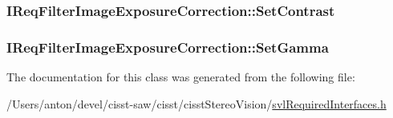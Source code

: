 \subsubsection[{Set\+Contrast}]{ I\+Req\+Filter\+Image\+Exposure\+Correction\+::\+Set\+Contrast}\label{class_i_req_filter_image_exposure_correction_a72a66c9ea243b3702d5f9bd6127a44f8}
\hypertarget{class_i_req_filter_image_exposure_correction_aa7eef8c01d176c56c5b2ed5aab3f903e}{}
\subsubsection[{Set\+Gamma}]{ I\+Req\+Filter\+Image\+Exposure\+Correction\+::\+Set\+Gamma}\label{class_i_req_filter_image_exposure_correction_aa7eef8c01d176c56c5b2ed5aab3f903e}


The documentation for this class was generated from the following file\+:\begin{DoxyCompactItemize}
\item 
/\+Users/anton/devel/cisst-\/saw/cisst/cisst\+Stereo\+Vision/\hyperlink{svl_required_interfaces_8h}{svl\+Required\+Interfaces.\+h}\end{DoxyCompactItemize}
